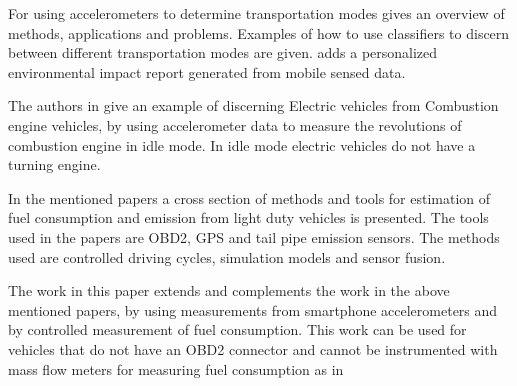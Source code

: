 For using accelerometers to determine transportation modes \cite{Hemminki2013} gives an overview of methods, applications and problems. Examples of how to use classifiers to discern between different transportation modes are given. \cite{mun_peir_2009} adds a personalized environmental impact report generated from mobile sensed data.

The authors in \cite{markus2014} give an example of discerning Electric vehicles from Combustion engine vehicles, by using accelerometer data to measure the revolutions of combustion engine in idle mode. In idle mode electric vehicles do not have a turning engine.


In the mentioned papers a cross section of methods and tools for estimation of fuel consumption and emission from light duty vehicles is presented. The tools used in the papers are OBD2, GPS and tail pipe emission sensors. The methods used are controlled driving cycles, simulation models and sensor fusion.
 
The work in this paper extends and complements the work in the above mentioned papers, by using measurements from smartphone accelerometers and by controlled measurement of fuel consumption. This work can be used for vehicles that do not have an OBD2 connector and cannot be instrumented with mass flow meters for measuring fuel consumption as in \cite{haan2000,Honicky}

